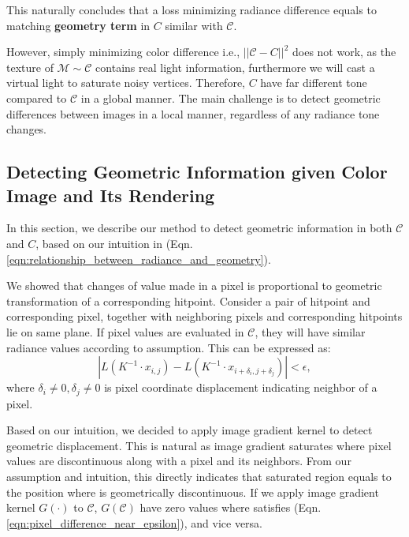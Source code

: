 This naturally concludes that a loss minimizing radiance difference equals to matching \textbf{geometry term} in $C$ similar with $\mathcal{C}$.

However, simply minimizing color difference i.e., $||\mathcal{C}-C||^2$ does not work, as the texture of $\mathcal{M} \sim \mathcal{C}$ contains real light information, furthermore we will cast a virtual light to saturate noisy vertices. 
Therefore, $C$ have far different tone compared to $\mathcal{C}$ in a global manner. 
The main challenge is to detect geometric differences between images in a local manner, regardless of any radiance tone changes.

\subsection{Detecting Geometric Information given Color Image and Its Rendering}
In this section, we describe our method to detect geometric information in both $\mathcal{C}$ and $C$, based on our intuition in (Eqn. \ref{eqn:relationship_between_radiance_and_geometry}).

We showed that changes of value made in a pixel is proportional to geometric transformation of a corresponding hitpoint.
Consider a pair of hitpoint and corresponding pixel, together with neighboring pixels and corresponding hitpoints lie on same plane.
If pixel values are evaluated in $\mathcal{C}$, they will have similar radiance values according to assumption. 
This can be expressed as:
\begin{equation}
    |L(K^{-1}\cdot x_{i,j})-L(K^{-1}\cdot x_{i+\delta_i, j+\delta_j})| < \epsilon, 
    \label{eqn:pixel_difference_near_epsilon}
\end{equation}
where $\delta_i \neq 0, \delta_j \neq 0$ is pixel coordinate displacement indicating neighbor of a pixel.

Based on our intuition, we decided to apply image gradient kernel to detect geometric displacement. 
This is natural as image gradient saturates where pixel values are discontinuous along with a pixel and its neighbors.
From our assumption and intuition, this directly indicates that saturated region equals to the position where is geometrically discontinuous.
If we apply image gradient kernel $G(\cdot)$ to $\mathcal{C}$, $G(\mathcal{C})$ have zero values where satisfies (Eqn. \ref{eqn:pixel_difference_near_epsilon}), and vice versa.

